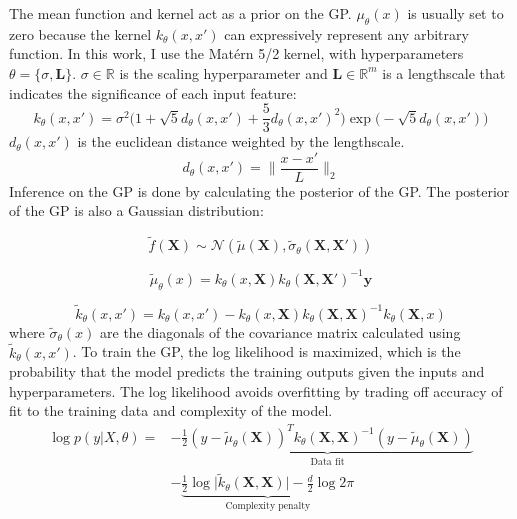 The mean function and kernel act as a prior on the GP.  $\mu_{\theta}(x)$ is usually set to zero because the kernel  $k_{\theta}(x, x')$ can expressively represent any arbitrary function. In this work, I use the Matérn 5/2 kernel, with hyperparameters $\theta=\{\sigma,\mathbf L \}$. $\sigma \in \mathbb R$ is the scaling hyperparameter and $\mathbf L \in \mathbb R^m$ is a lengthscale that indicates the significance of each input feature:
\begin{equation}
    k_{\theta}(x, x') = \sigma^2 \biggl(1 + \sqrt{5}d_{\theta}(x,x')+\frac{5}{3}d_{\theta}(x,x')^2\biggr)\exp\biggl(-\sqrt{5}d_{\theta}(x,x') \biggr)
\end{equation}
$d_{\theta}(x,x')$ is the euclidean distance weighted by the lengthscale.
\begin{equation}
    d_{\theta}(x,x')=\biggl\lVert \frac{x-x'}{L} \biggr\rVert_2
\end{equation}
Inference on the GP is done by calculating the posterior of the GP. The posterior of the GP is also a Gaussian distribution:

\begin{equation}
     \tilde f(\mathbf X) \sim \mathcal N(\tilde \mu(\mathbf X), \tilde \sigma_{\theta}(\mathbf X, \mathbf X'))
\end{equation}

\begin{equation}
    \tilde \mu_{\theta}(x) = k_{\theta}(x, \mathbf X)k_{\theta}(\mathbf X, \mathbf X')^{-1} \mathbf y
\end{equation}

\begin{equation}
    \tilde k_{\theta}(x,x') = k_{\theta}( x, x')-k_{\theta}(x, \mathbf X) k_{\theta}(\mathbf X, \mathbf X)^{-1}k_{\theta}(\mathbf X, x)
\end{equation}
where $\tilde \sigma_{\theta}(x)$ are the diagonals of the covariance matrix calculated using $\tilde k_{\theta}(x, x')$.
To train the GP, the log likelihood is maximized, which is the probability that the model predicts the training outputs given the inputs and hyperparameters. The log likelihood avoids overfitting by trading off accuracy of fit to the training data and complexity of the model.
\begin{equation}
\begin{split}
    \log p(y \vert X, \theta) = & -\underbrace{\frac{1}{2}(y-\tilde \mu_{\theta}(\mathbf X))^T k_{\theta}(\mathbf X, \mathbf X)^{-1}(y- \tilde\mu_{\theta}(\mathbf X)) }_{\text{Data  fit}} \\
    & - \underbrace{\frac{1}{2} \log{\vert \tilde k_{\theta}(\mathbf X, \mathbf X) \vert} - \frac{d}{2}\log{2 \pi}}_{\text{Complexity penalty}}
\end{split}
\end{equation}

